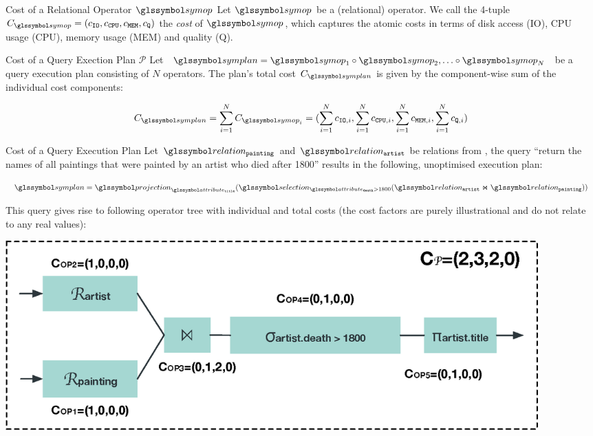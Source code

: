\begin{definition}[label=definition:op_cost]{Cost of a Relational Operator $\symop$}{}
    Let $\symop$ be a (relational) operator. We call the 4-tuple $C_{\symop} = (c_{\mathtt{IO}}, c_{\mathtt{CPU}}, c_{\mathtt{MEM}},c_{\mathtt{Q}})$ the \emph{cost} of $\symop$, which captures the atomic costs in terms of disk access (IO), CPU usage (CPU), memory usage (MEM) and quality (Q).
\end{definition}

\begin{definition}[label=definition:plan_cost]{Cost of a Query Exection Plan $\mathcal{P}$}{}
    Let $\symplan = \symop_1 \circ \symop_2, \ldots \circ \symop_N $ be a query execution plan consisting of $N$ operators. The plan's total cost $C_{\symplan}$ is given by the component-wise sum of the individual cost components:

    \begin{equation*}
        C_{\symplan} = \sum_{i=1}^{N} C_{\symop_i} = (\sum_{i=1}^{N} c_{\mathtt{IO},i}, \sum_{i=1}^{N} c_{\mathtt{CPU},i}, \sum_{i=1}^{N} c_{\mathtt{MEM},i}, \sum_{i=1}^{N} c_{\mathtt{Q},i})
    \end{equation*}
\end{definition}

\begin{example}[label=example:cost_model]{Cost of a Query Execution Plan}{}
    Let $\relation_{\mathtt{painting}}$ and $\relation_{\mathtt{artist}}$ be relations from , the query ``return the names of all paintings that were painted by an artist who died after 1800'' results in the following, unoptimised execution plan:

    \begin{equation*}
        \symplan= \projection_{\attribute_{\mathtt{title}}}(\selection_{\attribute_{\mathtt{death}} > 1800}(\relation_{\mathtt{artist}} \Join \relation_{\mathtt{painting}}))
    \end{equation*}

    This query gives rise to following operator tree with individual and total costs (the cost factors are purely illustrational and do not relate to any real values):

    \begin{center}
        \includegraphics[width=0.90\textwidth]{figures/cost_example.eps}
    \end{center}
\end{example}

